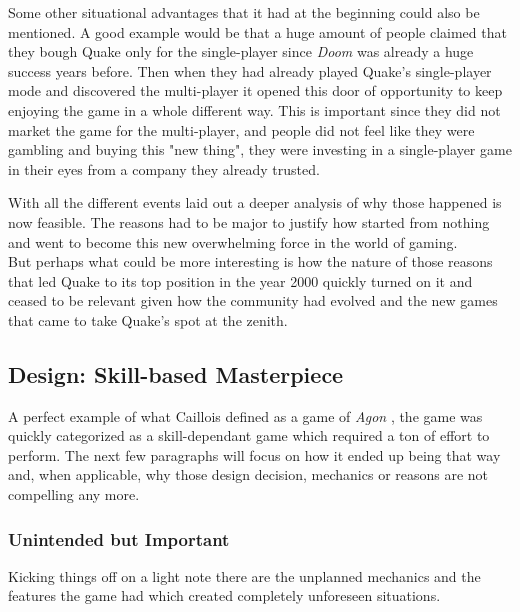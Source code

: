 {Some other situational advantages that it had at the beginning could also be mentioned. A good example would be that a huge amount of people claimed that they bough Quake only for the single-player since \textit{Doom} was already a huge success years before. Then when they had already played Quake's single-player mode and discovered the multi-player it opened this door of opportunity to keep enjoying the game in a whole different way. This is important since they did not market the game for the multi-player, and people did not feel like they were gambling and buying this "new thing", they were investing in a single-player game in their eyes from a company they already trusted.\\

}

With all the different events laid out a deeper analysis of why those happened is now feasible. The reasons had to be major to justify how started from nothing and went to become this new overwhelming force in the world of gaming.\\

But perhaps what could be more interesting is how the nature of those reasons that led Quake to its top position in the year 2000 quickly turned on it and ceased to be relevant given how the community had evolved and the new games that came to take Quake's spot at the zenith.\\

\subsection{Design: Skill-based Masterpiece}

A perfect example of what Caillois defined as a game of \textit{Agon} \citep{caillois1961man}, the game was quickly categorized as a skill-dependant game which required a ton of effort to perform. The next few paragraphs will focus on how it ended up being that way and, when applicable, why those design decision, mechanics or reasons are not compelling any more.

\subsubsection{Unintended but Important}

Kicking things off on a light note there are the unplanned mechanics and the features the game had which created completely unforeseen situations.\\

